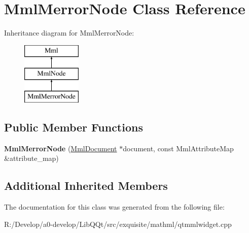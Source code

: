 \hypertarget{class_mml_merror_node}{}\section{Mml\+Merror\+Node Class Reference}
\label{class_mml_merror_node}
Inheritance diagram for Mml\+Merror\+Node\+:\begin{figure}[H]
\begin{center}
\leavevmode
\includegraphics[height=3.000000cm]{class_mml_merror_node}
\end{center}
\end{figure}
\subsection*{Public Member Functions}
\begin{DoxyCompactItemize}
\item 
\mbox{\label{class_mml_merror_node_a0317801e614bea37f2be3f89ec89cacf}} 
{\bfseries Mml\+Merror\+Node} (\mbox{\hyperlink{class_mml_document}{Mml\+Document}} $\ast$document, const Mml\+Attribute\+Map \&attribute\+\_\+map)
\end{DoxyCompactItemize}
\subsection*{Additional Inherited Members}


The documentation for this class was generated from the following file\+:\begin{DoxyCompactItemize}
\item 
R\+:/\+Develop/a0-\/develop/\+Lib\+Q\+Qt/src/exquisite/mathml/qtmmlwidget.\+cpp\end{DoxyCompactItemize}
